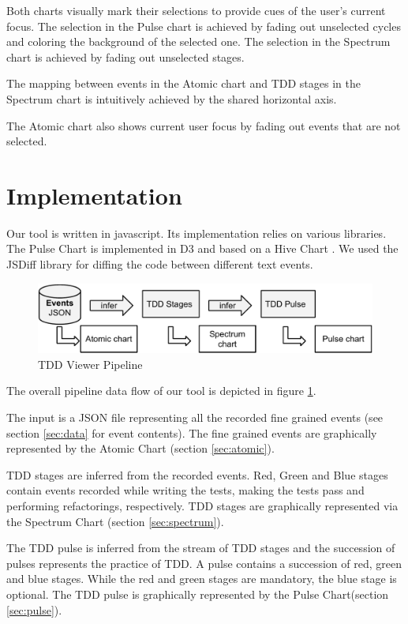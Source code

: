 \documentclass[journal]{vgtc}                %
\begin{document}
Both charts visually mark their selections to provide cues of the user's current focus.
The selection in the Pulse chart is achieved by fading out unselected cycles and coloring the background of the selected one.
The selection in the Spectrum chart is achieved by fading out unselected stages.

The mapping between events in the Atomic chart and TDD stages in the Spectrum chart is intuitively achieved by the shared horizontal axis.

The Atomic chart also shows current user focus by fading out events that are not selected.
\section{Implementation}

Our tool is written in javascript.
Its implementation relies on various libraries.
The Pulse Chart is implemented in D3 \cite{three} and based on a Hive Chart \cite{four}.
We used the JSDiff library \cite{five} for diffing the code between different text events.

\begin{figure}[H]
	\includegraphics[width=\columnwidth]{implementation}
	\caption{TDD Viewer Pipeline}
	\label{fig:tool_pipeline}
\end{figure}

The overall pipeline data flow of our tool is depicted in figure \ref{fig:tool_pipeline}.

The input is a JSON file representing all the recorded fine grained events (see section \ref{sec:data} for event contents).
The fine grained events are graphically represented by the Atomic Chart (section \ref{sec:atomic}).

TDD stages are inferred from the recorded events.
Red, Green and Blue stages contain events recorded while writing the tests, making the tests pass and performing refactorings, respectively.
TDD stages are graphically represented via the Spectrum Chart (section \ref{sec:spectrum}).

The TDD pulse is inferred from the stream of TDD stages and the succession of pulses represents the practice of TDD.
A pulse contains a succession of red, green and blue stages.
While the red and green stages are mandatory, the blue stage is optional.
The TDD pulse is graphically represented by the Pulse Chart(section \ref{sec:pulse}).
\end{document}
